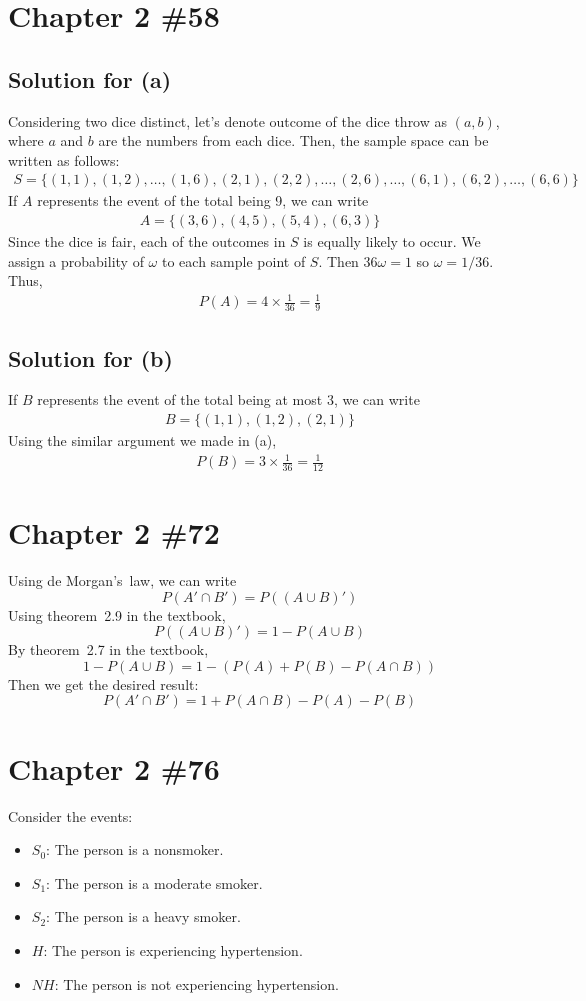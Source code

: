 \documentclass{scrartcl}
\begin{document}
\section{Chapter 2 \#58}
\subsection{Solution for (a)}
Considering two dice distinct, let's denote outcome of the dice throw as
\((a, b)\), where \(a\) and \(b\) are the numbers from each dice. Then, the
sample space can be written as follows:
\begin{align*}
  S = \{(1, 1), (1, 2), \dots, (1, 6), (2, 1), (2, 2), \dots, (2, 6), \dots,
  (6, 1), (6, 2), \dots, (6, 6)\}
\end{align*}
If \(A\) represents the event of the total being 9, we can write
\begin{align*}
  A = \{(3, 6), (4, 5), (5, 4), (6, 3)\}
\end{align*}
Since the dice is fair, each of the outcomes in \(S\) is equally likely to
occur. We assign a probability of \(\omega\) to each sample point of \(S\).
Then \(36\omega = 1\) so \(\omega = 1 / 36\). Thus,
\begin{align*}
  P(A) = 4 \times \frac{1}{36} = \frac{1}{9}
\end{align*}

\subsection{Solution for (b)}
If \(B\) represents the event of the total being at most 3, we can write
\begin{align*}
  B = \{(1, 1), (1, 2), (2, 1)\}
\end{align*}
Using the similar argument we made in (a),
\begin{align*}
  P(B) = 3 \times \frac{1}{36} = \frac{1}{12}
\end{align*}

\section{Chapter 2 \#72}
Using de Morgan's~law, we can write
\[ P(A' \cap B') = P((A \cup B)') \]
Using theorem~2.9 in the textbook,
\[ P((A \cup B)') = 1 - P(A \cup B) \]
By theorem~2.7 in the textbook,
\[ 1 - P(A \cup B) = 1 - (P (A) + P(B) - P(A \cap B)) \]
Then we get the desired result:
\[ P(A' \cap B') = 1 + P(A \cap B) - P (A) - P(B) \]

\section{Chapter 2 \#76}
Consider the events:
\begin{itemize}
  \item \(S_0\): The person is a nonsmoker.
  \item \(S_1\): The person is a moderate smoker.
  \item \(S_2\): The person is a heavy smoker.
  \item \(H\): The person is experiencing hypertension.
  \item \(NH\): The person is not experiencing hypertension.
\end{itemize}
\end{document}
